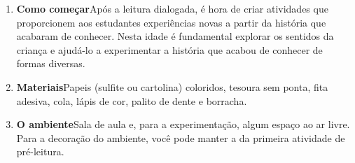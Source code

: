 \documentclass[11pt]{extarticle}
\begin{document}
\begin{enumerate}
\item \textbf{Como começar}\quad Após a leitura dialogada, é hora de criar 
atividades que proporcionem aos estudantes experiências novas a partir da história 
que acabaram de conhecer. Nesta idade é fundamental explorar os sentidos da criança e 
ajudá-lo a experimentar a história que acabou de conhecer de formas diversas. 



\item \textbf{Materiais}\quad Papeis (sulfite ou cartolina) coloridos,
tesoura sem ponta, fita adesiva, cola, lápis de cor, palito de dente
e borracha. 

\item \textbf{O ambiente}\quad Sala de aula e, para a experimentação,
algum espaço ao ar livre. Para a decoração do ambiente, você pode manter
a da primeira atividade de pré-leitura.


\end{enumerate}
\end{document}
